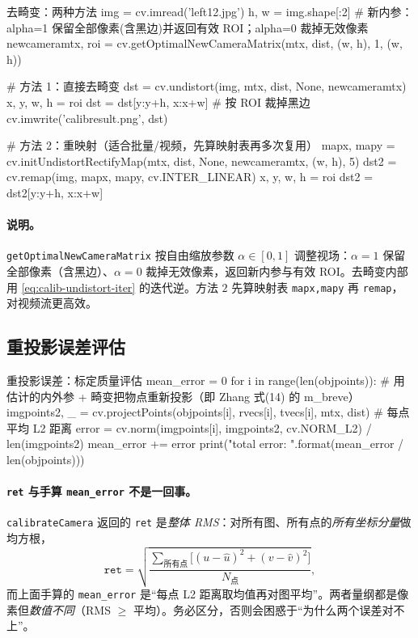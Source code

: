 \begin{codebox}[Python]{去畸变：两种方法}
img = cv.imread('left12.jpg')
h, w = img.shape[:2]
# 新内参：alpha=1 保留全部像素(含黑边)并返回有效 ROI；alpha=0 裁掉无效像素
newcameramtx, roi = cv.getOptimalNewCameraMatrix(mtx, dist, (w, h), 1, (w, h))

# 方法 1：直接去畸变
dst = cv.undistort(img, mtx, dist, None, newcameramtx)
x, y, w, h = roi
dst = dst[y:y+h, x:x+w]          # 按 ROI 裁掉黑边
cv.imwrite('calibresult.png', dst)

# 方法 2：重映射（适合批量/视频，先算映射表再多次复用）
mapx, mapy = cv.initUndistortRectifyMap(mtx, dist, None, newcameramtx, (w, h), 5)
dst2 = cv.remap(img, mapx, mapy, cv.INTER_LINEAR)
x, y, w, h = roi
dst2 = dst2[y:y+h, x:x+w]
\end{codebox}

\paragraph{说明。}
\texttt{getOptimalNewCameraMatrix} 按自由缩放参数 $\alpha\in[0,1]$ 调整视场：$\alpha=1$ 保留全部像素（含黑边）、$\alpha=0$ 裁掉无效像素，返回新内参与有效 ROI。去畸变内部用 \cref{eq:calib-undistort-iter} 的迭代逆。方法 $2$ 先算映射表 \texttt{mapx,mapy} 再 \texttt{remap}，对视频流更高效。

\subsection{重投影误差评估}

\begin{codebox}[Python]{重投影误差：标定质量评估}
mean_error = 0
for i in range(len(objpoints)):
    # 用估计的内外参 + 畸变把物点重新投影（即 Zhang 式(14) 的 m_breve）
    imgpoints2, _ = cv.projectPoints(objpoints[i], rvecs[i], tvecs[i], mtx, dist)
    # 每点平均 L2 距离
    error = cv.norm(imgpoints[i], imgpoints2, cv.NORM_L2) / len(imgpoints2)
    mean_error += error
print("total error: {}".format(mean_error / len(objpoints)))
\end{codebox}

\paragraph{\texttt{ret} 与手算 \texttt{mean\_error} 不是一回事。}
\texttt{calibrateCamera} 返回的 \texttt{ret} 是\emph{整体 RMS}：对所有图、所有点的\emph{所有坐标分量}做均方根，
\begin{equation}
  \texttt{ret}=\sqrt{\frac{\sum_{\text{所有点}}\big[(u-\hat u)^2+(v-\hat v)^2\big]}{N_{\text{点}}}},
  \label{eq:calib-rms}
\end{equation}
而上面手算的 \texttt{mean\_error} 是“每点 L2 距离取均值再对图平均”。两者量纲都是像素但\emph{数值不同}（RMS $\ge$ 平均）。务必区分，否则会困惑于“为什么两个误差对不上”。

